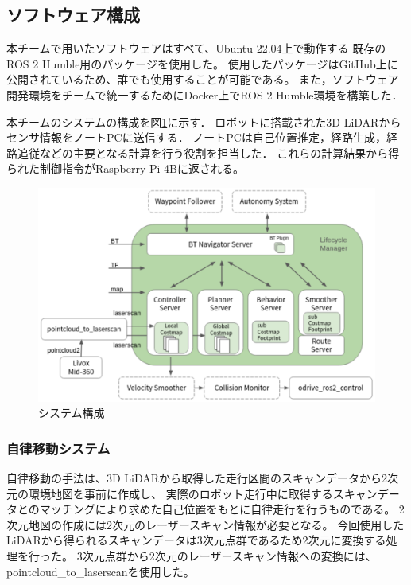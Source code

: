 \documentclass[twocolumn,9pt]{jsproceedings}
\begin{document}
\subsection{ソフトウェア構成}\label{sub:software}

本チームで用いたソフトウェアはすべて、Ubuntu 22.04上で動作する
既存のROS 2 Humble用のパッケージを使用した。
使用したパッケージはGitHub上に公開されているため、誰でも使用することが可能である。
また，ソフトウェア開発環境をチームで統一するためにDocker上でROS 2 Humble環境を構築した．

本チームのシステムの構成を図\ref{fig:shinsotu_system_diagram}に示す．
ロボットに搭載された3D LiDARからセンサ情報をノートPCに送信する．
ノートPCは自己位置推定，経路生成，経路追従などの主要となる計算を行う役割を担当した．
これらの計算結果から得られた制御指令がRaspberry Pi 4Bに返される。

\begin{figure}[h]
  \begin{center}
    \includegraphics[width=1.0\linewidth]{figs/shinsotu_system_diagram.pdf}
    \caption{システム構成 \cite{nav2_docs}}
    \label{fig:shinsotu_system_diagram}
  \end{center}
\end{figure}


\subsubsection{自律移動システム}

自律移動の手法は、3D LiDARから取得した走行区間のスキャンデータから2次元の環境地図を事前に作成し、
実際のロボット走行中に取得するスキャンデータとのマッチングにより求めた自己位置をもとに自律走行を行うものである。
2次元地図の作成には2次元のレーザースキャン情報が必要となる。
今回使用したLiDARから得られるスキャンデータは3次元点群であるため2次元に変換する処理を行った。
3次元点群から2次元のレーザースキャン情報への変換には、pointcloud\_to\_laserscan\cite{pcl_lsc}を使用した。
\end{document}
